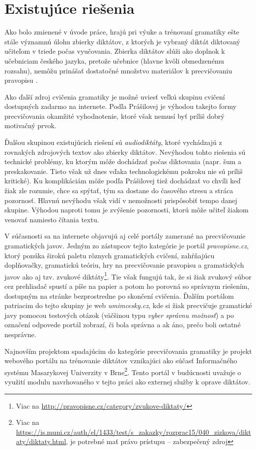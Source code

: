 \documentclass[12pt,oneside]{fithesis2}
\begin{document}
	\section{Existujúce riešenia}       
       	\par Ako bolo zmienené v úvode práce, hrajú pri výuke a trénovaní gramatiky ešte stále významnú úlohu zbierky diktátov, z ktorých je vybraný diktát diktovaný učiteľom v triede počas vyučovania. Zbierka diktátov slúži ako doplnok k učebniciam českého jazyka, pretože učebnice (hlavne kvôli obmedzenému rozsahu), nemôžu prinášať dostatočné množstvo materiálov k precvičovaniu pravopisu \cite{prasilova14}.
       	\par Ako ďalší zdroj cvičenia gramatiky je možné uviesť veľkú skupinu cvičení dostupných zadarmo na internete. Podľa Prášilovej\cite{prasilova14} je výhodou takejto formy precvičovania okamžité vyhodnotenie, ktoré však nemusí byť príliš dobrý motivačný prvok.
       	\par Ďalšou skupinou existujúcich riešení sú \textit{audiodiktáty}, ktoré vychádzajú z rovnakých zdrojových textov ako zbierky diktátov. Nevýhodou tohto riešenia sú technické problémy, ku ktorým môže dochádzať počas diktovania (napr. šum a preskakovanie. Tieto však už dnes vďaka technologickému pokroku nie sú príliš kritické). Ku komplikáciám môže podľa Prášilovej tiež dochádzať vo chvíli keď žiak zle rozumie, chce sa spýtať, tým sa dostane do časového stresu a stráca pozornosť. Hlavnú nevýhodu však vidí v nemožnosti prispôsobiť tempo danej skupine. Výhodou naproti tomu je zvýšenie pozornosti, ktorú môže učiteľ žiakom venovať namiesto čítania textu.
		\par V súčasnosti sa na internete objavujú aj celé portály zamerané na precvičovanie gramatických javov. Jedným zo zástupcov tejto kategórie je portál \textit{pravopisne.cz}, ktorý ponúka širokú paletu rôznych gramatických cvičení, zahŕňajúcu doplňovačky, gramatickú teóriu, hry na precvičovanie pravopisu a gramatických javov ako aj tzv. zvukové diktáty\footnote{Viac na \url{http://pravopisne.cz/category/zvukove-diktaty/}}. Tie však fungujú tak, že si žiak zvukový súbor cez prehliadač spustí a píše na papier a potom ho porovná so správnym riešením, dostupným na stránke bezprostredne po skončení cvičenia. Ďalším portálom patriacim do tejto skupiny je web \textit{umimcesky.cz}, kde si žiak precvičuje gramatické javy pomocou testových otázok (väčšinou typu \textit{vyber správnu možnosť}) a po označení odpovede portál zobrazí, či bola správna a ak áno, prečo boli ostatné nesprávne.
		\par Najnovším projektom spadajúcim do kategórie precvičovania gramatiky je projekt webového portálu na trénovanie diktátov vznikajúci ako súčasť Informačného systému Masarykovej Univerzity v Brne\footnote{ Viac na \url{https://is.muni.cz/auth/el/1433/test/s_zakazky/rozprac15/040_zizkova/diktaty/diktaty.html}, je potrebné mať právo prístupu -- zabezpečený zdroj }. Tento portál v budúcnosti uvažuje o využití modulu navrhovaného v tejto práci ako externej služby k oprave diktátov.
		
\end{document}
